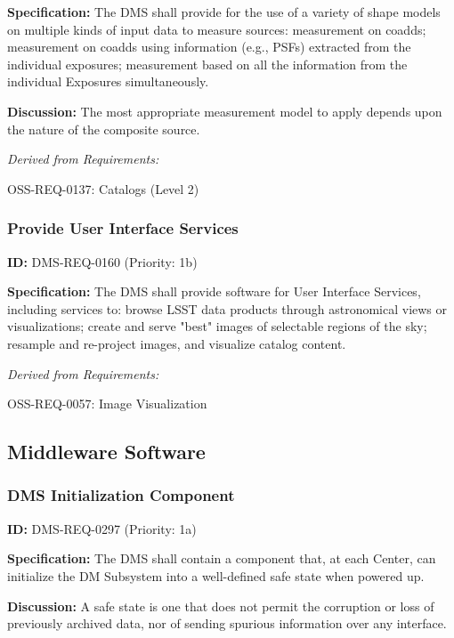 \documentclass[SE,toc,lsstdraft]{lsstdoc}
\begin{document}
\textbf{Specification:} The DMS shall provide for the use of a variety of shape models on multiple kinds of input data to measure sources: measurement on coadds; measurement on coadds using information (e.g., PSFs) extracted from the individual exposures; measurement based on all the information from the individual Exposures simultaneously.

\textbf{Discussion: }The most appropriate measurement model to apply depends upon the nature of the composite source.

\emph{Derived from Requirements:}

OSS-REQ-0137:
Catalogs (Level 2) \newline

\subsubsection{Provide User Interface Services}

\label{DMS-REQ-0160}
\textbf{ID:} DMS-REQ-0160 (Priority: 1b)

\textbf{Specification:} The DMS shall provide software for User Interface Services, including services to: browse LSST data products through astronomical views or visualizations; create and serve "best" images of selectable regions of the sky; resample and re-project images, and visualize catalog content.

\emph{Derived from Requirements:}

OSS-REQ-0057:
Image Visualization \newline

\subsection{Middleware Software}

\subsubsection{DMS Initialization Component}

\label{DMS-REQ-0297}
\textbf{ID:} DMS-REQ-0297 (Priority: 1a)

\textbf{Specification:} The DMS shall contain a component that, at each Center, can initialize the DM Subsystem into a well-defined safe state when powered up.

\textbf{Discussion: }A safe state is one that does not permit the corruption or loss of previously archived data, nor of sending spurious information over any interface.
\end{document}
